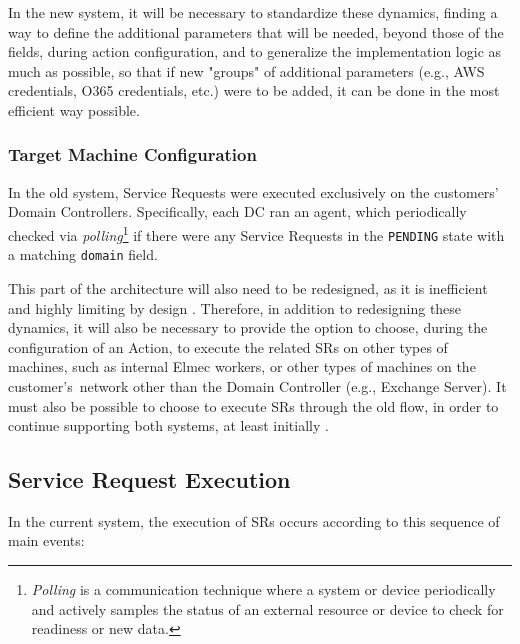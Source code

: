 In the new system, it will be necessary to standardize these dynamics, finding a way to define the additional parameters that will be needed, beyond those of the fields, during action configuration, and to generalize the implementation logic as much as possible, so that if new "groups" of additional parameters (e.g., AWS credentials, O365 credentials, etc.) were to be added, it can be done in the most efficient way possible.

\subsubsection{Target Machine Configuration}
In the old system, Service Requests were executed exclusively on the customers' Domain Controllers. Specifically, each DC ran an agent, which periodically checked via \textit{polling}\footnote{\textit{Polling} is a communication technique where a system or device periodically and actively samples the status of an external resource or device to check for readiness or new data.} if there were any Service Requests in the \texttt{PENDING} state with a matching \texttt{domain} field. 

This part of the architecture will also need to be redesigned, as it is inefficient and highly limiting by design \cite{polling}. Therefore, in addition to redesigning these dynamics, it will also be necessary to provide the option to choose, during the configuration of an Action, to execute the related SRs on other types of machines, such as internal Elmec workers, or other types of machines on the customer's~network other than the Domain Controller (e.g., Exchange Server). It must also be possible to choose to execute SRs through the old flow, in order to continue supporting both systems, at least initially \cite{requirements_meeting}.

\subsection{Service Request Execution}
In the current system, the execution of SRs occurs according to this sequence of main events:

